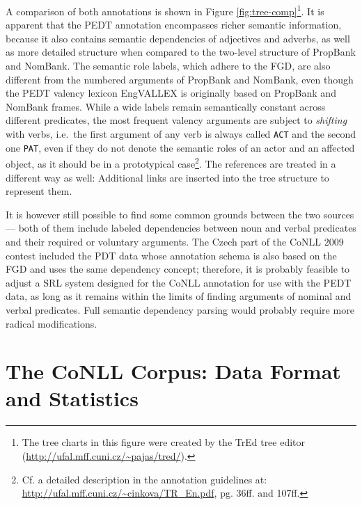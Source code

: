 \documentclass[12pt,notitlepage]{report}
\begin{document}
A comparison of both annotations is shown in Figure \ref{fig:tree-comp}\footnote{The tree charts in this figure were created by the TrEd tree editor\\(\url{http://ufal.mff.cuni.cz/\~pajas/tred/}).}. It is apparent that the PEDT annotation encompasses richer semantic information, because it also contains semantic dependencies of adjectives and adverbs, as well as more detailed structure when compared to the two-level structure of PropBank and NomBank. The semantic role labels, which adhere to the FGD, are also different from the numbered arguments of PropBank and NomBank, even though the PEDT valency lexicon EngVALLEX \citep{semecky06} is originally based on PropBank and NomBank frames. While a wide labels remain semantically constant across different predicates, the most frequent valency arguments are subject to \emph{shifting} with verbs, i.e.\ the first argument of any verb is always called \texttt{ACT} and the second one \texttt{PAT}, even if they do not denote the semantic roles of an actor and an affected object, as it should be in a prototypical case\footnote{Cf. a detailed description in the annotation guidelines at: \\ \url{http://ufal.mff.cuni.cz/\~cinkova/TR\_En.pdf}, pg. 36ff. and 107ff.}. The references are treated in a different way as well: Additional links are inserted into the tree structure to represent them.

It is however still possible to find some common grounds between the two sources --- both of them include labeled dependencies between noun and verbal predicates and their required or voluntary arguments. The Czech part of the CoNLL 2009 contest included the PDT data whose annotation schema is also based on the FGD and uses the same dependency concept; therefore, it is probably feasible to adjust a SRL system designed for the CoNLL annotation for use with the PEDT data, as long as it remains within the limits of finding arguments of nominal and verbal predicates. Full semantic dependency parsing would probably require more radical modifications.

\section{The CoNLL Corpus: Data Format and Statistics}\label{data-format}
\end{document}
